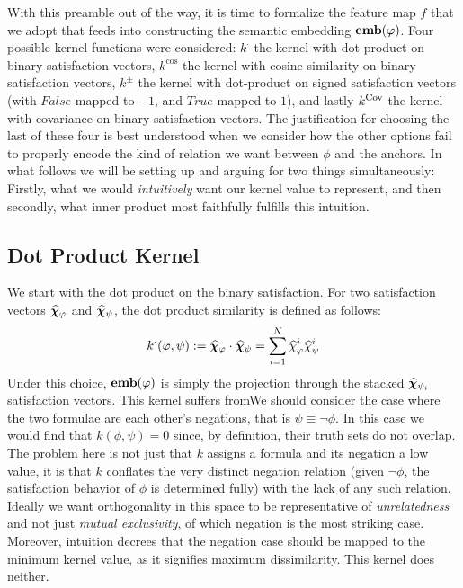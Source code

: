 \documentclass[titlepage,a4paper,11pt]{report}
\begin{document}
    With this preamble out of the way, it is time to formalize the feature map $f$ that we adopt that feeds into constructing the semantic embedding $\textbf{emb}(\varphi)$. Four possible kernel functions were considered: $k^{\cdot}$ the kernel with dot-product on binary satisfaction vectors, $k^{\cos}$ the kernel with cosine similarity on binary satisfaction vectors, $k^{\pm}$ the kernel with dot-product on signed satisfaction vectors (with $False$ mapped to $-1$, and $True$ mapped to $1$), and lastly $k^{\mathrm{Cov}}$ the kernel with covariance on binary satisfaction vectors.  The justification for choosing the last of these four is best understood when we consider how the other options fail to properly encode the kind of relation we want between $\phi$ and the anchors. In what follows we will be setting up and arguing for two things simultaneously: Firstly, what we would \emph{intuitively} want our kernel value to represent, and then secondly, what inner product most faithfully fulfills this intuition.

    \subsection{Dot Product Kernel}
    We start with the dot product on the binary satisfaction. For two satisfaction vectors $\bm{\widehat\chi}_\varphi$ and $\bm{\widehat\chi}_\psi$, the dot product similarity is defined as follows:
    \begin{equation}\label{eq:dot_kernel}
        k^{\cdot}(\varphi,\psi):=\bm{\widehat\chi}_\varphi \cdot \bm{\widehat\chi}_\psi = \sum^N_{i=1} \widehat \chi^i_{\varphi} \widehat \chi^i_{\psi}
    \end{equation}
    Under this choice, $\textbf{emb}(\varphi)$ is simply the projection through the stacked $\bm{\widehat\chi}_{\psi_i}$ satisfaction vectors. This kernel suffers fromWe should consider the case where the two formulae are each other's negations, that is $\psi \equiv \neg\phi$. In this case we would find that $k(\phi,\psi)=0$ since, by definition, their truth sets do not overlap. The problem here is not just that $k$ assigns a formula and its negation a low value, it is that $k$ conflates the very distinct negation relation (given $\neg \phi$, the satisfaction behavior of $\phi$ is determined fully) with the lack of any such relation. Ideally we want orthogonality in this space to be representative of \emph{unrelatedness} and not just \emph{mutual exclusivity}, of which negation is the most striking case. Moreover, intuition decrees that the negation case should be mapped to the minimum kernel value, as it signifies maximum dissimilarity. This kernel does neither.
    
\end{document}
